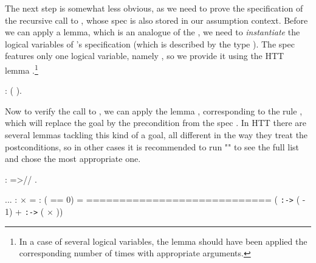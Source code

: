 \coqdocemptyline
The next step is somewhat less obvious, as we need to prove the
specification of the recursive call to , whose spec is also
stored in our assumption context. Before we can apply a lemma, which
is an analogue of the , we need to \textit{instantiate} the
logical variables of 's specification (which is described by the
type ). The spec  features only one logical variable,
namely , so we provide it using the HTT lemma .\footnote{In
a case of several logical variables, the lemma should have been
applied the corresponding number of times with appropriate
arguments.}
\begin{coqdoccode}
\coqdocemptyline
\coqdocnoindent
{}: ( ).\coqdoceol
\coqdocemptyline
\end{coqdoccode}
Now to verify the call to , we can apply the lemma ,
corresponding to the rule , which will replace the goal by
the precondition from the spec   . In HTT there are
several lemmas tackling this kind of a goal, all different in the way
they treat the postconditions, so in other cases it is recommended to
run  "" to see the full list and chose the most
appropriate one.
\begin{coqdoccode}
\coqdocemptyline
\coqdocnoindent
{}: =>// \coqdocvar{\_}.\coqdoceol
\coqdocemptyline
\end{coqdoccode}
\coqdoceol
\coqdocemptyline
\coqdocindent{1.00em}
...\coqdoceol
\coqdocindent{1.00em}
 :   \ensuremath{\times}  =  \coqdoceol
\coqdocindent{1.00em}
 : ( == 0) = \coqdoceol
\coqdocindent{1.00em}
============================\coqdoceol
\coqdocindent{1.50em}
    ( \texttt{:->} ( - 1) +  \texttt{:->} ( \ensuremath{\times} ))


